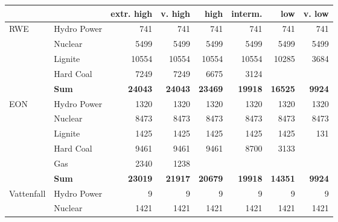 
\begin{table}
\centering

\begin{tabular}{llrrrrrr}
\hline
\hline
           &            & extr. high &    v. high &       high &    interm. &        low &     v. low \\
\hline
       RWE & Hydro Power &        741 &        741 &        741 &        741 &        741 &        741 \\

           &    Nuclear &       5499 &       5499 &       5499 &       5499 &       5499 &       5499 \\

           &    Lignite &      10554 &      10554 &      10554 &      10554 &      10285 &       3684 \\

           &  Hard Coal &       7249 &       7249 &       6675 &       3124 &            &            \\

           &  {\bf Sum} & {\bf 24043} & {\bf 24043} & {\bf 23469} & {\bf 19918} & {\bf 16525} & {\bf 9924} \\
\hline
       EON & Hydro Power &       1320 &       1320 &       1320 &       1320 &       1320 &       1320 \\

           &    Nuclear &       8473 &       8473 &       8473 &       8473 &       8473 &       8473 \\

           &    Lignite &       1425 &       1425 &       1425 &       1425 &       1425 &        131 \\

           &  Hard Coal &       9461 &       9461 &       9461 &       8700 &       3133 &            \\

           &        Gas &       2340 &       1238 &            &            &            &            \\

           &  {\bf Sum} & {\bf 23019} & {\bf 21917} & {\bf 20679} & {\bf 19918} & {\bf 14351} & {\bf 9924} \\
\hline
Vattenfall & Hydro Power &          9 &          9 &          9 &          9 &          9 &          9 \\

           &    Nuclear &       1421 &       1421 &       1421 &       1421 &       1421 &       1421 \\


\end{tabular}
\end{table}
